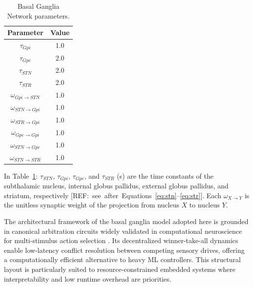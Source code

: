 \documentclass[preprint,12pt]{elsarticle}
\begin{document}
\begin{table}[t]
\centering
\caption{Basal Ganglia Network parameters.}
\begin{tabular}{|c|c|}
\hline
\textbf{Parameter} & \textbf{Value} \\ \hline
$\tau_{Gpi}$ & 1.0 \\ \hline
$\tau_{Gpe}$ & 2.0 \\ \hline
$\tau_{STN}$ & 2.0 \\ \hline
$\tau_{STR}$ & 2.0 \\ \hline
$\omega_{Gpi\rightarrow STN}$ & 1.0 \\ \hline
$\omega_{STN\rightarrow Gpi}$ & 1.0 \\ \hline
$\omega_{STR\rightarrow Gpi}$ & 1.0 \\ \hline
$\omega_{Gpe\rightarrow Gpi}$ & 1.0 \\ \hline
$\omega_{STN\rightarrow Gpe}$ & 1.0 \\ \hline
$\omega_{STN\rightarrow STR}$ & 1.0 \\ \hline
\end{tabular}
\label{table:Ganglia}
\end{table}
In Table~\ref{table:Ganglia}: $\tau_{STN}$, $\tau_{Gpi}$, $\tau_{Gpe}$, and $\tau_{STR}$ (s) are the time constants of the subthalamic nucleus, internal globus pallidus, external globus pallidus, and striatum, respectively \mbox{[REF: see after Equations~\eqref{eq:stn}--\eqref{eq:str}]}.
Each $\omega_{X\rightarrow Y}$ is the unitless synaptic weight of the projection from nucleus $X$ to nucleus $Y$.

The architectural framework of the basal ganglia model adopted here is grounded in canonical arbitration circuits widely validated in computational neuroscience for multi-stimulus action selection \citep{Gurney2001a,Gurney2001b,Prescott2006Robot}. Its decentralized winner-take-all dynamics enable low-latency conflict resolution between competing sensory drives, offering a computationally efficient alternative to heavy ML controllers. This structural layout is particularly suited to resource-constrained embedded systems where interpretability and low runtime overhead are priorities.
\end{document}
